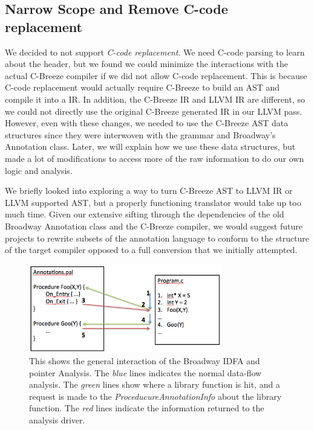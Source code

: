 \subsection{Narrow Scope and Remove C-code replacement}
We decided to not support \textit{C-code replacement}. We need C-code parsing to learn about the header, but we found we could minimize the interactions with the actual C-Breeze compiler if we did not allow C-code replacement. This is because C-code replacement would actually require C-Breeze to build an AST and compile it into a IR. 
In addition, the C-Breeze IR and LLVM IR are different, so we could not directly use the original C-Breeze generated IR in our LLVM pass. However, even with these changes, we needed to use the C-Breeze AST data structures since they were interwoven with the grammar and Broadway's Annotation class. Later, we will explain how we use these data structures, but made a lot of modifications to access more of the raw information to do our own logic and analysis.

We briefly looked into exploring a way to turn C-Breeze AST to LLVM IR or LLVM supported AST, but a properly functioning translator would take up too much time. Given our extensive sifting through the dependencies of the old Broadway Annotation class and the C-Breeze compiler, we would suggest future projects to rewrite subsets of the annotation language to conform to the structure of the target compiler opposed to a full conversion that we initially attempted.

\begin{figure}[t!]
\begin{center}
\includegraphics[width=0.75\textwidth]{interface}
\caption{This shows the general interaction of the Broadway IDFA and pointer Analysis. The  \textit{blue} lines indicates the normal data-flow analysis. The \textit{green} lines show where a library function is hit, and a request is made to the \textit{ProceducureAnnotationInfo} about the library function. The \textit{red} lines indicate the information returned to the analysis driver.  }
\label{fig:interface}
\end{center}
\end{figure}


